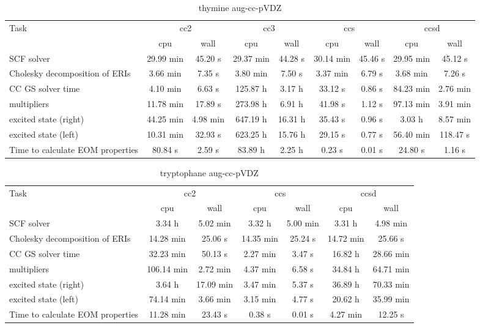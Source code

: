 \documentclass{article}
\begin{document}
\begin{table}
\caption{thymine aug-cc-pVDZ}
\begin{tabular}{lcccccccc}
\toprule
Task & \multicolumn{2}{c}{cc2} & \multicolumn{2}{c}{cc3} & \multicolumn{2}{c}{ccs} & \multicolumn{2}{c}{ccsd}\\
\cmidrule(lr){2-3}\cmidrule(lr){4-5}\cmidrule(lr){6-7}\cmidrule(lr){8-9}
 & cpu & wall & cpu & wall & cpu & wall & cpu & wall\\
\midrule
SCF solver & 29.99 min & 45.20 s & 29.37 min & 44.28 s & 30.14 min & 45.46 s & 29.95 min & 45.12 s\\
Cholesky decomposition of ERIs & 3.66 min & 7.35 s & 3.80 min & 7.50 s & 3.37 min & 6.79 s & 3.68 min & 7.26 s\\
CC GS solver time & 4.10 min & 6.63 s & 125.87 h & 3.17 h & 33.12 s & 0.86 s & 84.23 min & 2.76 min\\
multipliers & 11.78 min & 17.89 s & 273.98 h & 6.91 h & 41.98 s & 1.12 s & 97.13 min & 3.91 min\\
excited state (right) & 44.25 min & 4.98 min & 647.19 h & 16.31 h & 35.43 s & 0.96 s & 3.03 h & 8.57 min\\
excited state (left) & 10.31 min & 32.93 s & 623.25 h & 15.76 h & 29.15 s & 0.77 s & 56.40 min & 118.47 s\\
Time to calculate EOM properties & 80.84 s & 2.59 s & 83.89 h & 2.25 h & 0.23 s & 0.01 s & 24.80 s & 1.16 s\\
\bottomrule
\end{tabular}
\end{table}
\begin{table}
\caption{tryptophane aug-cc-pVDZ}
\begin{tabular}{lcccccc}
\toprule
Task & \multicolumn{2}{c}{cc2} & \multicolumn{2}{c}{ccs} & \multicolumn{2}{c}{ccsd}\\
\cmidrule(lr){2-3}\cmidrule(lr){4-5}\cmidrule(lr){6-7}
 & cpu & wall & cpu & wall & cpu & wall\\
\midrule
SCF solver & 3.34 h & 5.02 min & 3.32 h & 5.00 min & 3.31 h & 4.98 min\\
Cholesky decomposition of ERIs & 14.28 min & 25.06 s & 14.35 min & 25.24 s & 14.72 min & 25.66 s\\
CC GS solver time & 32.23 min & 50.13 s & 2.27 min & 3.47 s & 16.82 h & 28.66 min\\
multipliers & 106.14 min & 2.72 min & 4.37 min & 6.58 s & 34.84 h & 64.71 min\\
excited state (right) & 3.64 h & 17.09 min & 3.47 min & 5.37 s & 36.89 h & 70.33 min\\
excited state (left) & 74.14 min & 3.66 min & 3.15 min & 4.77 s & 20.62 h & 35.99 min\\
Time to calculate EOM properties & 11.28 min & 23.43 s & 0.38 s & 0.01 s & 4.27 min & 12.25 s\\
\bottomrule
\end{tabular}
\end{table}
\end{document}
